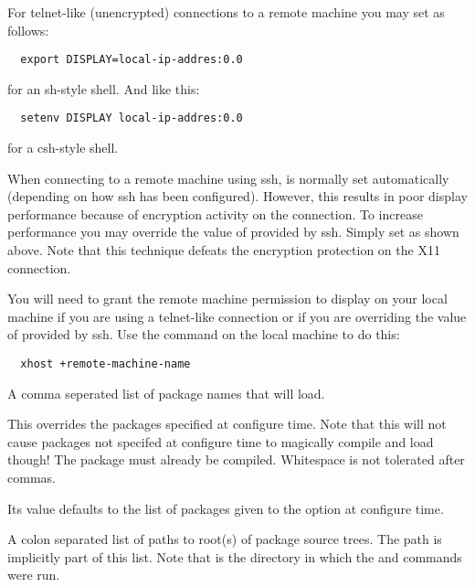 \begin{description}
  For telnet-like (unencrypted) connections to a remote machine
  you may set  as follows:

\begin{verbatim}
  export DISPLAY=local-ip-addres:0.0
\end{verbatim}
  
  for an sh-style shell. And like this:

\begin{verbatim}
  setenv DISPLAY local-ip-addres:0.0
\end{verbatim}

  for a csh-style shell.

  When connecting to a remote machine using ssh,  is
  normally set automatically (depending on how ssh has been
  configured).  However, this results in poor display performance
  because of encryption activity on the connection.  To increase
  performance you may override the value of  provided
  by ssh.  Simply set  as
  shown above.  Note that this technique defeats the encryption
  protection on the X11 connection.

  You will need to grant the remote machine permission to display on
  your local machine if you are using a telnet-like connection or if
  you are overriding the value of  provided by ssh.
  Use the  command on the local machine to do
  this:

\begin{verbatim}
  xhost +remote-machine-name
\end{verbatim}

  
  A comma seperated list of package names that \sr{} will load.
  
  This overrides the packages specified at configure time.  Note
  that this will not cause packages not specifed at configure time
  to magically compile and load though!  The package must already be
  compiled.  Whitespace is not tolerated after commas.
  
  Its value defaults to the list of packages given to the
   option at configure time.
  
  
  A colon separated list of paths to root(s) of package source trees.
  The path  is implicitly part
  of this list.  Note that  is the directory in
  which the  and  commands were run.
  

\end{description}
